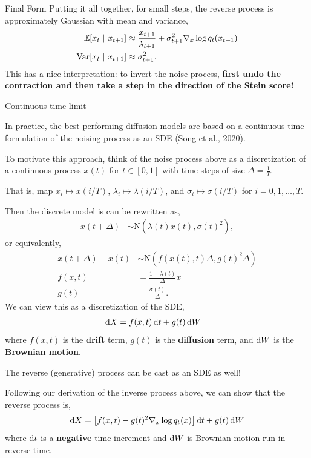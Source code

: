 \documentclass[aspectratio=169]{beamer}
\begin{document}
\begin{frame}[t,allowframebreaks]{Final Form}
Putting it all together, for
small steps, the reverse process is approximately Gaussian with mean and
variance, 
\begin{align*}
\mathbb{E}[x_t ~\vert~ x_{t+1}]
&\approx \frac{x_{t+1}}{\lambda_{t+1}} + \sigma_{t+1}^2 \nabla_x \log q_t(x_{t+1})  \\
\textrm{Var}[x_t ~\vert~ x_{t+1}] &\approx \sigma_{t+1}^2.
\end{align*} 
This has a nice interpretation: to invert the noise
process, \textbf{first undo the contraction and then take a step in the
direction of the Stein score!} 
\end{frame}

\begin{frame}[t,allowframebreaks]{Continuous time limit}\label{continuous-time-limit}

In practice, the best performing diffusion models are based on a
continuous-time formulation of the noising process as an SDE (Song et al., 2020). 

To motivate this approach, think of
the noise process above as a discretization of a continuous process
\(x(t)\) for \(t \in [0,1]\) with time steps of size
\(\Delta = \tfrac{1}{T}\). 

That is, map \(x_i \mapsto x(i/T)\),
\(\lambda_i \mapsto \lambda(i/T)\), and \(\sigma_i \mapsto \sigma(i/T)\)
for \(i=0,1,\ldots, T\). 

Then the discrete model is can be rewritten as,
\begin{align*}
x(t + \Delta) 
&\sim \mathrm{N}(\lambda(t) x(t), \sigma(t)^2),
\end{align*} 
or equivalently, 
\begin{align*}
x(t + \Delta) - x(t) 
&\sim \mathrm{N}\left(f(x(t), t) \Delta, g(t)^2 \Delta \right)  \\
f(x, t) &= \frac{1 - \lambda(t)}{\Delta} x \\
g(t) &= \frac{\sigma(t)}{\Delta}.
\end{align*} 
We can view this as a discretization of the SDE,
\begin{align*}
\mathop{}\!\mathrm{d} X &= f(x, t) \mathop{}\!\mathrm{d} t + g(t) \mathop{}\!\mathrm{d} W
\end{align*} where \(f(x,t)\) is the \textbf{drift} term, \(g(t)\) is
the \textbf{diffusion} term, and \(\mathop{}\!\mathrm{d} W\) is the \textbf{Brownian
motion}.

The reverse (generative) process can be cast as an SDE as well!

Following our derivation of the inverse process above, we can show that
the reverse process is, 
\begin{align*}
\mathop{}\!\mathrm{d} X = \left[f(x, t) - g(t)^2 \nabla_x \log q_t(x)\right] \mathop{}\!\mathrm{d} t + g(t) \mathop{}\!\mathrm{d} W
\end{align*} 
where \(\mathop{}\!\mathrm{d} t\) is a \textbf{negative} time increment and
\(\mathop{}\!\mathrm{d} W\) is Brownian motion run in reverse time.

\end{frame}
\end{document}
